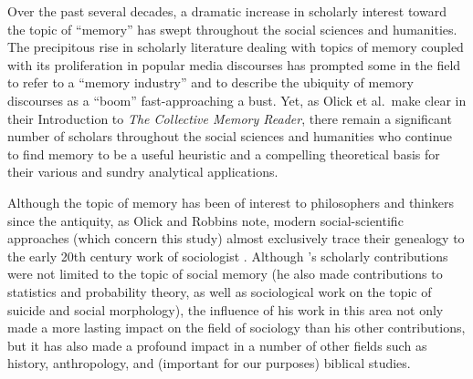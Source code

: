 
Over the past several decades, a dramatic increase in scholarly interest toward the topic of ``memory'' has swept throughout the social sciences and humanities. The precipitous rise in scholarly literature dealing with topics of memory coupled with its proliferation in popular media discourses has prompted some in the field to refer to a ``memory industry'' and to describe the ubiquity of memory discourses as a ``boom'' fast-approaching a bust.\autocites{rosenfeld_jmh2009}{winter2006}{berliner_aq2005}{confino_ahr1997} Yet, as Olick et al.~make clear in their Introduction to \emph{The Collective Memory Reader}, there remain a significant number of scholars throughout the social sciences and humanities who continue to find memory to be a useful heuristic and a compelling theoretical basis for their various and sundry analytical applications.\autocite[3--6]{olick_olick-etal2011}  

Although the topic of memory has been of interest to philosophers and thinkers since the antiquity,\autocite{carruthers_radstone-schwarz2011} as Olick and Robbins note, modern social-scientific approaches (which concern this study) almost exclusively trace their genealogy to the early 20th century work of sociologist \Halbwachs.\autocites[106]{olick-robbins_ars1998}[It should be noted, however, that \halbwachs was not the first or only person to do work on memory or the impact of social structures on memory. See][8--36]{olick_olick-etal2011} Although \halbwachs's scholarly contributions were not limited to the topic of social memory (he also made contributions to statistics and probability theory, as well as sociological work on the topic of suicide and social morphology), the influence of his work in this area not only made a more lasting impact on the field of sociology than his other contributions, but it has also made a profound impact in a number of other fields such as history, anthropology, and (important for our purposes) biblical studies.\autocite[13--20]{coser_halbwachs1992} 
